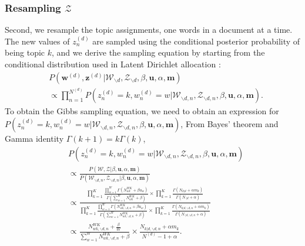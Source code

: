 \documentclass[a4paper]{article}
\begin{document}
   \subsubsection{Resampling $\mathcal{Z}$}  \label{subsec: Resampling Z}
   
   Second, we resample the topic assignments, one words in a document at a time.  The new values of $z^{(d)}_n$ are sampled using the conditional posterior probability of being topic $k$, and we derive the sampling equation by starting from the conditional distribution used in Latent Dirichlet allocation \citep{Blei2003}:
     \begin{equation}
     \begin{aligned}
     & P(\boldsymbol{w}^{(d)}, \boldsymbol{z}^{(d)}|\mathcal{W}_{\backslash d}, \mathcal{Z}_{\backslash d}, \beta, \boldsymbol{u}, \alpha, \boldsymbol{m}) \\& \propto \prod_{n=1}^{N^{(d)}}P(z^{(d)}_n=k, w^{(d)}_n=w| \mathcal{W}_{\backslash d, n}, \mathcal{Z}_{\backslash d, n}, \beta, \boldsymbol{u}, \alpha, \boldsymbol{m}).
     \end{aligned}
     \end{equation} 
     To obtain the Gibbs sampling equation, we need to obtain an expression for $P(z^{(d)}_n=k,  w^{(d)}_n=w|\mathcal{W}_{\backslash d, n}, \mathcal{Z}_{\backslash d, n}, \beta, \boldsymbol{u}, \alpha, \boldsymbol{m})$,
     From Bayes' theorem and Gamma identity $\Gamma(k+1)=k\Gamma(k)$,
     \begin{equation}
     \begin{aligned}
     & P(z^{(d)}_n=k, w^{(d)}_n=w|\mathcal{W}_{\backslash d, n}, \mathcal{Z}_{\backslash d, n}, \beta, \boldsymbol{u}, \alpha, \boldsymbol{m}) \\& \propto 
     \frac{P(\mathcal{W}, \mathcal{Z}|\beta, \boldsymbol{u}, \alpha, \boldsymbol{m})}{P(\mathcal{W}_{\backslash d, n}, \mathcal{Z}_{\backslash d, n}|\beta, \boldsymbol{u}, \alpha, \boldsymbol{m})}\\& \propto \frac{\prod_{k=1}^{K}\frac{\prod_{w=1}^W\Gamma(N_{wk}^{WK}+\beta u_w)}{\Gamma(\sum_{w=1}^WN_{wk}^{WK}+\beta )}\times\prod_{k=1}^K\frac{\Gamma(N_{k|d}+\alpha m_k)}{\Gamma(N_{\cdot|d}+\alpha)}}{\prod_{k=1}^{K}\frac{\prod_{w=1}^W\Gamma(N_{wk, \backslash d, n}^{WK}+\beta u_w)}{\Gamma(\sum_{w=1}^WN_{wk, \backslash d, n}^{WK}+\beta )}\times\prod_{k=1}^K\frac{\Gamma(N_{k|d, \backslash d, n}+\alpha m_k)}{\Gamma(N_{\cdot|d, \backslash d, n}+\alpha)}}\\ & \propto 
     \frac{N_{wk, \backslash d, n}^{WK}+\frac{\beta}{W}}{\sum_{w=1}^WN_{wk,  \backslash d, n}^{WK}+\beta}\times\frac{N_{k|d, \backslash d, n}+\alpha m_k}{N^{(d)}-1+\alpha}.
     \end{aligned}
     \end{equation}
\end{document}
